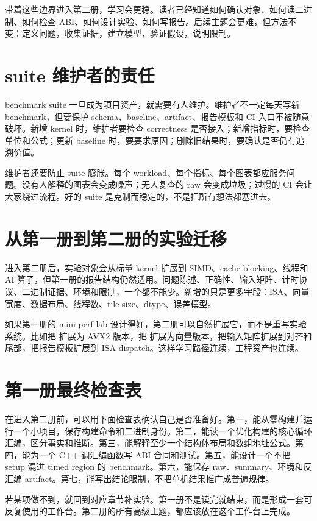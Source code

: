 带着这些边界进入第二册，学习会更稳。读者已经知道如何确认对象、如何读二进制、如何检查 ABI、如何设计实验、如何写报告。后续主题会更难，但方法不变：定义问题，收集证据，建立模型，验证假设，说明限制。

\section{suite 维护者的责任}

benchmark suite 一旦成为项目资产，就需要有人维护。维护者不一定每天写新 benchmark，但要保护 schema、baseline、artifact、报告模板和 CI 入口不被随意破坏。新增 kernel 时，维护者要检查 correctness 是否接入；新增指标时，要检查单位和公式；更新 baseline 时，要要求原因；删除旧结果时，要确认是否仍有追溯价值。

维护者还要防止 suite 膨胀。每个 workload、每个指标、每个图表都应服务问题。没有人解释的图表会变成噪声；无人复查的 raw 会变成垃圾；过慢的 CI 会让大家绕过流程。好的 suite 是克制而稳定的，不是把所有想法都塞进去。

\section{从第一册到第二册的实验迁移}

进入第二册后，实验对象会从标量 kernel 扩展到 SIMD、cache blocking、线程和 AI 算子，但第一册的报告结构仍然适用。问题陈述、正确性、输入矩阵、计时协议、二进制证据、环境和限制，一个都不能少。新增的只是更多字段：ISA、向量宽度、数据布局、线程数、tile size、dtype、误差模型。

如果第一册的 mini perf lab 设计得好，第二册可以自然扩展它，而不是重写实验系统。比如把  扩展为 AVX2 版本，把  扩展为向量版本，把输入矩阵扩展到对齐和尾部，把报告模板扩展到 ISA dispatch。这样学习路径连续，工程资产也连续。

\section{第一册最终检查表}

在进入第二册前，可以用下面检查表确认自己是否准备好。第一，能从零构建并运行一个小项目，保存构建命令和二进制身份。第二，能读一个优化构建的核心循环汇编，区分事实和推断。第三，能解释至少一个结构体布局和数组地址公式。第四，能为一个 C++ 调汇编函数写 ABI 合同和测试。第五，能设计一个不把 setup 混进 timed region 的 benchmark。第六，能保存 raw、summary、环境和反汇编 artifact。第七，能写出结论限制，不把单机结果推广成普遍规律。

若某项做不到，就回到对应章节补实验。第一册不是读完就结束，而是形成一套可反复使用的工作台。第二册的所有高级主题，都应该放在这个工作台上完成。

